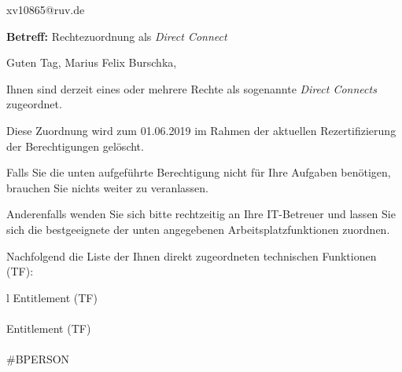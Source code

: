 \documentclass[a4paper,landscape,12pt]{letter}
\begin{document}
\begin{letter}{xv10865@ruv.de\hfill \break}
\begin{normalsize}
	\opening{\textbf{Betreff:} Rechtezuordnung als \emph{Direct Connect}}
	\begin{normalsize} \hfill
	\end{normalsize}

	\begin{normalsize}
		Guten Tag, 
	Marius Felix Burschka, \hfill \break
	\end{normalsize}
	\end{normalsize}
	
\begin{normalsize}
	Ihnen sind derzeit eines oder mehrere Rechte als sogenannte \emph{Direct Connects} zugeordnet.
	
	Diese Zuordnung wird zum 01.06.2019 im Rahmen der aktuellen Rezertifizierung der Berechtigungen gelöscht.
	
	Falls Sie die unten aufgeführte Berechtigung nicht für Ihre Aufgaben benötigen, 
	brauchen Sie nichts weiter zu veranlassen.
	
	Anderenfalls wenden Sie sich bitte rechtzeitig an Ihre IT-Betreuer 
	und lassen Sie sich die bestgeeignete der unten angegebenen Arbeitsplatzfunktionen zuordnen.
	\end{normalsize}
	
\begin{normalsize}
	Nachfolgend die Liste der Ihnen direkt zugeordneten technischen Funktionen (TF):

	\begin{longtable}{l}
		Entitlement (TF) \\ \hline
		\endfirsthead
		\\\hline
		Entitlement (TF) \\ \hline
		\endhead %
		\multicolumn{1}{r@{}}{Fortsetzung \ldots}\\
		\endfoot
		\hline
		\endlastfoot
	\#BPERSON\\
	\end{longtable}
	\end{normalsize}
	

\end{letter}
\end{document}
